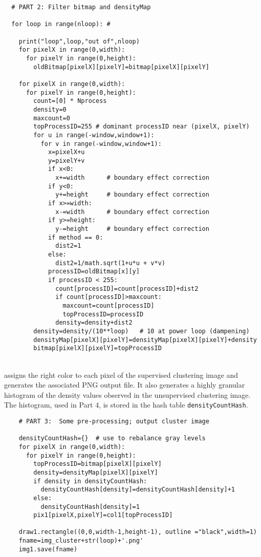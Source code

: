 \documentclass[10pt]{article}
\begin{document}
\begin{lstlisting}
  # PART 2: Filter bitmap and densityMap

  for loop in range(nloop): #

    print("loop",loop,"out of",nloop)
    for pixelX in range(0,width):
      for pixelY in range(0,height):
        oldBitmap[pixelX][pixelY]=bitmap[pixelX][pixelY]

    for pixelX in range(0,width):
      for pixelY in range(0,height):
        count=[0] * Nprocess
        density=0
        maxcount=0
        topProcessID=255 # dominant processID near (pixelX, pixelY)
        for u in range(-window,window+1):
          for v in range(-window,window+1):
            x=pixelX+u
            y=pixelY+v
            if x<0:
              x+=width      # boundary effect correction
            if y<0:
              y+=height     # boundary effect correction
            if x>=width:
              x-=width      # boundary effect correction
            if y>=height:
              y-=height     # boundary effect correction
            if method == 0:
              dist2=1
            else:
              dist2=1/math.sqrt(1+u*u + v*v)
            processID=oldBitmap[x][y]
            if processID < 255:
              count[processID]=count[processID]+dist2
              if count[processID]>maxcount:
                maxcount=count[processID]
                topProcessID=processID
              density=density+dist2
        density=density/(10**loop)   # 10 at power loop (dampening)
        densityMap[pixelX][pixelY]=densityMap[pixelX][pixelY]+density
        bitmap[pixelX][pixelY]=topProcessID
\end{lstlisting}
\quad \\
 assigns the right color to each pixel of the supervised clustering image and generates the associated PNG output file. It also generates a highly granular histogram of the density values observed in the unsupervised clustering image. The histogram, used in Part 4,  is stored in the hash table \texttt{densityCountHash}.
\begin{lstlisting}
    # PART 3:  Some pre-processing; output cluster image

    densityCountHash={}  # use to rebalance gray levels
    for pixelX in range(0,width):
      for pixelY in range(0,height):
        topProcessID=bitmap[pixelX][pixelY]
        density=densityMap[pixelX][pixelY]
        if density in densityCountHash:
          densityCountHash[density]=densityCountHash[density]+1
        else:
          densityCountHash[density]=1
        pix1[pixelX,pixelY]=col1[topProcessID]

    draw1.rectangle((0,0,width-1,height-1), outline ="black",width=1)
    fname=img_cluster+str(loop)+'.png'
    img1.save(fname)
\end{lstlisting}
\end{document}
